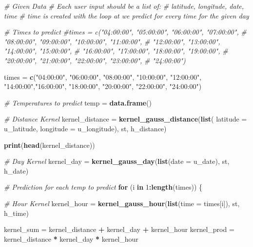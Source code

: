 \documentclass[]{article}
\newenvironment{Shaded}{\begin{snugshade}}{\end{snugshade}}
\newcommand{\KeywordTok}[1]{\textcolor[rgb]{0.13,0.29,0.53}{\textbf{#1}}}
\newcommand{\DataTypeTok}[1]{\textcolor[rgb]{0.13,0.29,0.53}{#1}}
\newcommand{\DecValTok}[1]{\textcolor[rgb]{0.00,0.00,0.81}{#1}}
\newcommand{\StringTok}[1]{\textcolor[rgb]{0.31,0.60,0.02}{#1}}
\newcommand{\CommentTok}[1]{\textcolor[rgb]{0.56,0.35,0.01}{\textit{#1}}}
\newcommand{\ControlFlowTok}[1]{\textcolor[rgb]{0.13,0.29,0.53}{\textbf{#1}}}
\newcommand{\OperatorTok}[1]{\textcolor[rgb]{0.81,0.36,0.00}{\textbf{#1}}}
\newcommand{\NormalTok}[1]{#1}
\begin{document}
\begin{Shaded}
\begin{Highlighting}[]
{{{{{{{  \CommentTok{# Given Data}
  \CommentTok{# Each user input should be a list of:}
  \CommentTok{# latitude, longitude, date, time}
  \CommentTok{# time is created with the loop at we predict for every time for the given day}
  
  \CommentTok{# Times to predict}
  \CommentTok{#times = c("04:00:00", "05:00:00", "06:00:00", "07:00:00",}
  \CommentTok{#          "08:00:00", "09:00:00", "10:00:00", "11:00:00",}
  \CommentTok{#          "12:00:00", "13:00:00", "14:00:00", "15:00:00",}
  \CommentTok{#          "16:00:00", "17:00:00", "18:00:00", "19:00:00",}
  \CommentTok{#          "20:00:00", "21:00:00", "22:00:00", "23:00:00",}
  \CommentTok{#          "24:00:00")}
  
\NormalTok{  times =}\StringTok{ }\KeywordTok{c}\NormalTok{(}\StringTok{"04:00:00"}\NormalTok{, }\StringTok{"06:00:00"}\NormalTok{, }\StringTok{"08:00:00"}\NormalTok{,  }\StringTok{"10:00:00"}\NormalTok{, }
            \StringTok{"12:00:00"}\NormalTok{,  }\StringTok{"14:00:00"}\NormalTok{,}\StringTok{"16:00:00"}\NormalTok{,  }\StringTok{"18:00:00"}\NormalTok{,}
            \StringTok{"20:00:00"}\NormalTok{,  }\StringTok{"22:00:00"}\NormalTok{, }\StringTok{"24:00:00"}\NormalTok{)}
  
  \CommentTok{# Temperatures to predict}
\NormalTok{  temp =}\StringTok{ }\KeywordTok{data.frame}\NormalTok{()}
  
  \CommentTok{# Distance Kernel}
\NormalTok{  kernel_distance =}\StringTok{ }\KeywordTok{kernel_gauss_distance}\NormalTok{(}\KeywordTok{list}\NormalTok{(}
      \DataTypeTok{latitude =}\NormalTok{ u_latitude, }\DataTypeTok{longitude =}\NormalTok{ u_longitude), st, h_distance)}
  
  \KeywordTok{print}\NormalTok{(}\KeywordTok{head}\NormalTok{(kernel_distance))}
  
  \CommentTok{# Day Kernel}
\NormalTok{  kernel_day =}\StringTok{ }\KeywordTok{kernel_gauss_day}\NormalTok{(}\KeywordTok{list}\NormalTok{(}\DataTypeTok{date =}\NormalTok{ u_date), st, h_date)}
  
  \CommentTok{# Prediction for each temp to predict}
  \ControlFlowTok{for}\NormalTok{ (i }\ControlFlowTok{in} \DecValTok{1}\OperatorTok{:}\KeywordTok{length}\NormalTok{(times)) \{}
    
    \CommentTok{# Hour Kernel}
\NormalTok{    kernel_hour =}\StringTok{ }\KeywordTok{kernel_gauss_hour}\NormalTok{(}\KeywordTok{list}\NormalTok{(}\DataTypeTok{time =}\NormalTok{ times[i]), st, h_time)}
    
\NormalTok{    kernel_sum =}\StringTok{ }\NormalTok{kernel_distance }\OperatorTok{+}\StringTok{ }\NormalTok{kernel_day }\OperatorTok{+}\StringTok{ }\NormalTok{kernel_hour}
\NormalTok{    kernel_prod =}\StringTok{ }\NormalTok{kernel_distance }\OperatorTok{*}\StringTok{ }\NormalTok{kernel_day }\OperatorTok{*}\StringTok{ }\NormalTok{kernel_hour}
    
}}}}}}}
\end{Highlighting}
\end{Shaded}
\end{document}

